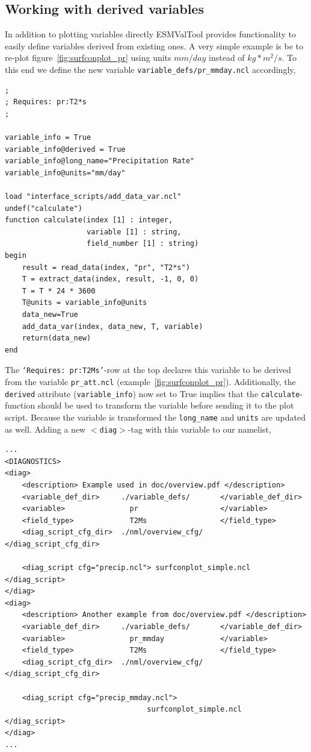 \documentclass[12pt]{article}
\newcommand{\xmltag}[1]{\texttt{$<$#1$>$}}
\begin{document}
\subsection{Working with derived variables}\label{subsection:derivedVariable} 
In addition to plotting variables directly ESMValTool provides
functionality to easily define variables derived from existing ones. A
very simple example is be to re-plot figure~\ref{fig:surfconplot_pr}
using units $mm/day$ instead of $kg*m^2/s$. To this end we define the
new variable \texttt{variable\_defs/pr\_mmday.ncl} accordingly, 
\begin{Verbatim}[frame=single, fontsize=\footnotesize]
;
; Requires: pr:T2*s
;

variable_info = True
variable_info@derived = True
variable_info@long_name="Precipitation Rate"
variable_info@units="mm/day"

load "interface_scripts/add_data_var.ncl"
undef("calculate")
function calculate(index [1] : integer,
                   variable [1] : string,
                   field_number [1] : string)
begin
    result = read_data(index, "pr", "T2*s")
    T = extract_data(index, result, -1, 0, 0)
    T = T * 24 * 3600
    T@units = variable_info@units
    data_new=True
    add_data_var(index, data_new, T, variable)
    return(data_new)
end
\end{Verbatim}  
The \texttt{`Requires: pr:T2Ms'}-row at the top declares this variable to be
derived from the variable \texttt{pr\_att.ncl}
(example~\ref{fig:surfconplot_pr}). Additionally, the \texttt{derived}
attribute (\texttt{variable\_info}) now set to True implies that the
\texttt{calculate}-function should be used to transform the variable before
sending it to the plot script. Because the variable is transformed the
\texttt{long\_name} and \texttt{units} are updated as well. Adding a new
\xmltag{diag}-tag with this variable to our namelist, 
\begin{Verbatim}[frame=single, fontsize=\footnotesize]
...
<DIAGNOSTICS>
<diag>
    <description> Example used in doc/overview.pdf </description>
    <variable_def_dir>     ./variable_defs/       </variable_def_dir>
    <variable>               pr                   </variable>
    <field_type>             T2Ms                 </field_type>
    <diag_script_cfg_dir>  ./nml/overview_cfg/    </diag_script_cfg_dir>

    <diag_script cfg="precip.ncl"> surfconplot_simple.ncl  </diag_script>
</diag>
<diag>
    <description> Another example from doc/overview.pdf </description>
    <variable_def_dir>     ./variable_defs/       </variable_def_dir>
    <variable>               pr_mmday             </variable>
    <field_type>             T2Ms                 </field_type>
    <diag_script_cfg_dir>  ./nml/overview_cfg/    </diag_script_cfg_dir>

    <diag_script cfg="precip_mmday.ncl"> 
                                 surfconplot_simple.ncl  </diag_script>
</diag>
...
\end{Verbatim}
\end{document}

